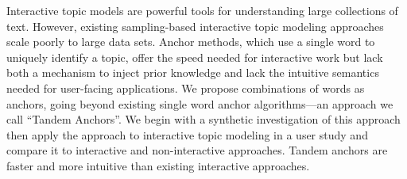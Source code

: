 Interactive topic models are powerful tools for understanding
large collections of text.
However, existing sampling-based interactive topic modeling approaches
scale poorly to large data sets.
Anchor methods, which use a single word to uniquely identify a topic,
offer the speed needed for interactive work but lack both
a mechanism to
inject prior knowledge and lack the intuitive semantics needed for user-facing
applications.
We propose combinations of words as anchors, going beyond
existing single word anchor algorithms---an approach we call ``Tandem
Anchors''.
We begin with a synthetic investigation of this approach
then apply the approach to interactive topic modeling in a user
study and compare it to interactive and non-interactive approaches.
Tandem anchors are faster and more intuitive than existing interactive approaches.
